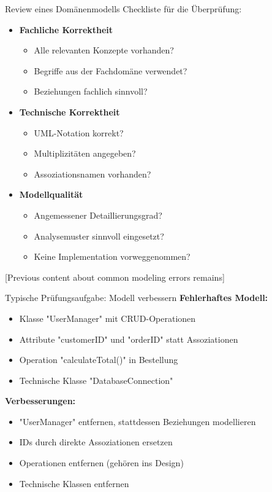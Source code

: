 \begin{KR}{Review eines Domänenmodells}
Checkliste für die Überprüfung:
\begin{itemize}
    \item \textbf{Fachliche Korrektheit}
    \begin{itemize}
        \item Alle relevanten Konzepte vorhanden?
        \item Begriffe aus der Fachdomäne verwendet?
        \item Beziehungen fachlich sinnvoll?
    \end{itemize}
    
    \item \textbf{Technische Korrektheit}
    \begin{itemize}
        \item UML-Notation korrekt?
        \item Multiplizitäten angegeben?
        \item Assoziationsnamen vorhanden?
    \end{itemize}
    
    \item \textbf{Modellqualität}
    \begin{itemize}
        \item Angemessener Detaillierungsgrad?
        \item Analysemuster sinnvoll eingesetzt?
        \item Keine Implementation vorweggenommen?
    \end{itemize}
\end{itemize}
\end{KR}

[Previous content about common modeling errors remains]

\begin{example}{Typische Prüfungsaufgabe: Modell verbessern}
\textbf{Fehlerhaftes Modell:}
\begin{itemize}
    \item Klasse "UserManager" mit CRUD-Operationen
    \item Attribute "customerID" und "orderID" statt Assoziationen
    \item Operation "calculateTotal()" in Bestellung
    \item Technische Klasse "DatabaseConnection"
\end{itemize}

\textbf{Verbesserungen:}
\begin{itemize}
    \item "UserManager" entfernen, stattdessen Beziehungen modellieren
    \item IDs durch direkte Assoziationen ersetzen
    \item Operationen entfernen (gehören ins Design)
    \item Technische Klassen entfernen
\end{itemize}
\end{example}